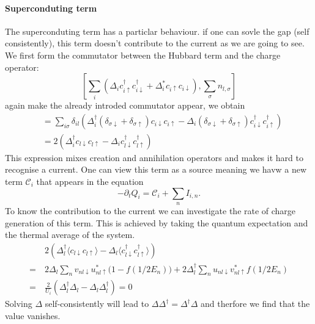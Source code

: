 \documentclass[../main.tex]{subfile}
\begin{document}
\paragraph{Superconduting term} The superconduting term has a particlar behaviour. if one can sovle the gap (self consistently), this term 
doesn't contribute to the current as we are going to see. We first form the commutator between the Hubbard term and the charge operator:
\begin{equation*}
        \left[\sum_i\left(\Delta_i c_{i\uparrow}^{\dagger}c_{i\downarrow}^{\dagger} + 
        \Delta_i^{\ast} c_{i\uparrow}c_{i\downarrow}\right) , \sum_{\sigma} n_{l,\sigma}\right]
\end{equation*}
again make the already introded commutator appear, we obtain
\begin{equation*}
    \begin{aligned}
    &= \sum_{i\sigma} \delta_{il}\left(\Delta_i^{\dagger} (\delta_{\sigma\downarrow} + \delta_{\sigma\uparrow})c_{i\downarrow}c_{i\uparrow} 
    -\Delta_i(\delta_{\sigma\downarrow} + \delta_{\sigma\uparrow})c_{i\downarrow}^{\dagger} c_{i\uparrow}^{\dagger}\right)\\
    &= 2 \left( \Delta_i^{\dagger} c_{l\downarrow}c_{l\uparrow} - \Delta_i c_{l\downarrow}^{\dagger}c_{l\uparrow}^{\dagger}\right)
    \end{aligned}
\end{equation*}
This expression mixes creation and annihilation operators and makes it hard to recognise a current. One can view this term as a 
source meaning we havw a new term $\mathcal{C}_i$ that appears in the equation  
\[
    -\partial_t Q_i = \mathcal{C}_i +  \sum_n I_{i,n}  .
\]
To know the contribution to the current we can investigate the rate of charge generation of this term. This is achieved by taking the quantum
expectation and the thermal average of the system.
\begin{align*}
    &~2\left(\Delta_l^{\dagger}\langle c_{l\downarrow}c_{l\uparrow}\rangle - \Delta_l\langle c_{l\downarrow}^{\dagger}c_{l\uparrow}^{\dagger}\rangle\right)\\
    =&~ 2 \Delta_l \sum_{n} v_{nl\downarrow}u_{nl\uparrow}^{\ast} \bigl(1-f\left(1/2 E_n\right)\bigr) + 2 \Delta_l^{\dagger} \sum_{n} u_{nl\downarrow}v_{nl\uparrow}^{\ast} f\left(1/2 E_n\right)\\
    =& ~ \frac{2}{U_i}\left(\Delta_l^{\dagger}\Delta_l -\Delta_l \Delta_l^{\dagger} \right) = 0
\end{align*}
Solving $\Delta$ self-consistently will lead to $\Delta\Delta^{\dagger} = \Delta^{\dagger}\Delta$ and therfore we find that the value vanishes.
\end{document}
